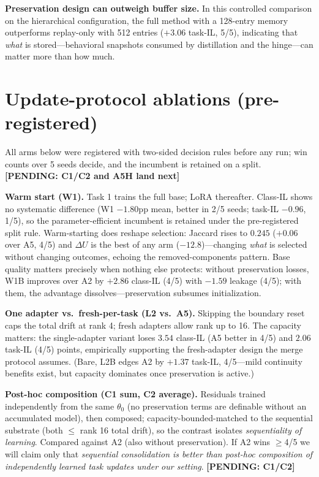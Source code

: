 \documentclass{article}
\newcommand{\pending}[1]{\textbf{[PENDING: #1]}}
\begin{document}
\textbf{Preservation design can outweigh buffer size.} In this controlled comparison on the hierarchical configuration, the full method with a 128-entry memory outperforms replay-only with 512 entries ($+3.06$ task-IL, 5/5), indicating that \emph{what} is stored---behavioral snapshots consumed by distillation and the hinge---can matter more than how much.

\section{Update-protocol ablations (pre-registered)}
\label{sec:ablations}
All arms below were registered with two-sided decision rules before any run; win counts over 5 seeds decide, and the incumbent is retained on a split. \pending{C1/C2 and A5H land next}

\textbf{Warm start (W1).} Task 1 trains the full base; LoRA thereafter. Class-IL shows no systematic difference (W1 $-1.80$pp mean, better in 2/5 seeds; task-IL $-0.96$, 1/5), so the parameter-efficient incumbent is retained under the pre-registered split rule. Warm-starting does reshape selection: Jaccard rises to $0.245$ ($+0.06$ over A5, 4/5) and $\Delta U$ is the best of any arm ($-12.8$)---changing \emph{what} is selected without changing outcomes, echoing the removed-components pattern. Base quality matters precisely when nothing else protects: without preservation losses, W1B improves over A2 by $+2.86$ class-IL (4/5) with $-1.59$ leakage (4/5); with them, the advantage dissolves---preservation subsumes initialization.

\textbf{One adapter vs.\ fresh-per-task (L2 vs.\ A5).} Skipping the boundary reset caps the total drift at rank 4; fresh adapters allow rank up to 16. The capacity matters: the single-adapter variant loses $3.54$ class-IL (A5 better in 4/5) and $2.06$ task-IL (4/5) points, empirically supporting the fresh-adapter design the merge protocol assumes. (Bare, L2B edges A2 by $+1.37$ task-IL, 4/5---mild continuity benefits exist, but capacity dominates once preservation is active.)

\textbf{Post-hoc composition (C1 sum, C2 average).} Residuals trained independently from the same $\theta_0$ (no preservation terms are definable without an accumulated model), then composed; capacity-bounded-matched to the sequential substrate (both $\le$ rank 16 total drift), so the contrast isolates \emph{sequentiality of learning}. Compared against A2 (also without preservation). If A2 wins $\ge$4/5 we will claim only that \emph{sequential consolidation is better than post-hoc composition of independently learned task updates under our setting}. \pending{C1/C2}
\end{document}
